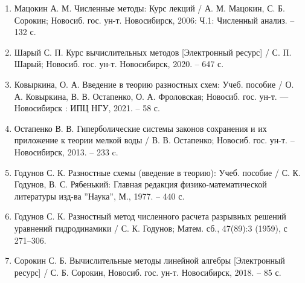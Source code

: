 \documentclass[../main.tex]{subfile}
\begin{document}
\begin{enumerate}[nosep]
	\item Мацокин А. М. Численные методы: Курс лекций / А. М. Мацокин,
		С. Б. Сорокин; Новосиб. гос. ун-т. Новосибирск, 2006: Ч.1:
		Численный анализ. -- 132 с.
	\item Шарый С. П. Курс вычислительных методов [Электронный ресурс] /
		С. П. Шарый; Новосиб. гос. ун-т. Новосибирск, 2020. -- 647 с.
	\item Ковыркина, О. А. Введение в теорию разностных схем: Учеб. пособие
		/ О. А. Ковыркина, В. В. Остапенко, О. А. Фроловская; Новосиб.
		гос. ун-т. --- Новосибирск : ИПЦ НГУ, 2021. -- 58 с.
	\item Остапенко В. В. Гиперболические системы законов сохранения и их
		приложение к теории мелкой воды / В. В. Остапенко; Новосиб. гос.
		ун-т. -- Новосибирск, 2013. -- 233 c.
	\item Годунов С. К. Разностные схемы (введение в теорию): Учеб. пособие /
		С. К. Годунов, В. С. Рябенький: Главная редакция
		физико-математической литературы изд-ва ''Наука'', М., 1977. --
		440 с.
	\item Годунов С. К. Разностный метод численного расчета разрывных
		решений уравнений гидродинамики / С. К. Годунов; Матем. сб.,
		47(89):3 (1959), с 271–306.
	\item Сорокин С. Б. Вычислительные методы линейной алгебры [Электронный
		ресурс] / С. Б. Сорокин, Новосиб. гос. ун-т. Новосибирск, 2018.
		-- 85 с.
\end{enumerate}
\end{document}
